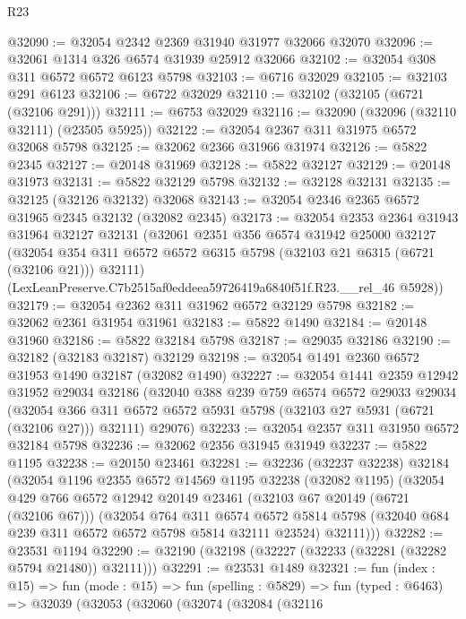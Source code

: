 \begin{lexlean}{R23}
\begin{coremodule}
@32090 := @32054 @2342 @2369 @31940 @31977 @32066 @32070
@32096 := @32061 @1314 @326 @6574 @31939 @25912 @32066
@32102 := @32054 @308 @311 @6572 @6572 @6123 @5798
@32103 := @6716 @32029
@32105 := @32103 @291 @6123
@32106 := @6722 @32029
@32110 := @32102 (@32105 (@6721 (@32106 @291)))
@32111 := @6753 @32029
@32116 := @32090 (@32096 (@32110 @32111) (@23505 @5925))
@32122 := @32054 @2367 @311 @31975 @6572 @32068 @5798
@32125 := @32062 @2366 @31966 @31974
@32126 := @5822 @2345
@32127 := @20148 @31969
@32128 := @5822 @32127
@32129 := @20148 @31973
@32131 := @5822 @32129 @5798
@32132 := @32128 @32131
@32135 := @32125 (@32126 @32132) @32068
@32143 := @32054 @2346 @2365 @6572 @31965 @2345 @32132 (@32082 @2345)
@32173 := @32054
    @2353
    @2364
    @31943
    @31964
    @32127
    @32131
    (@32061
      @2351
      @356
      @6574
      @31942
      @25000
      @32127
      (@32054 @354 @311 @6572 @6572 @6315 @5798 (@32103 @21 @6315 (@6721 (@32106 @21))) @32111)
      (LexLeanPreserve.C7b2515af0eddeea59726419a6840f51f.R23.__rel_46 @5928))
@32179 := @32054 @2362 @311 @31962 @6572 @32129 @5798
@32182 := @32062 @2361 @31954 @31961
@32183 := @5822 @1490
@32184 := @20148 @31960
@32186 := @5822 @32184 @5798
@32187 := @29035 @32186
@32190 := @32182 (@32183 @32187) @32129
@32198 := @32054 @1491 @2360 @6572 @31953 @1490 @32187 (@32082 @1490)
@32227 := @32054
    @1441
    @2359
    @12942
    @31952
    @29034
    @32186
    (@32040
      @388
      @239
      @759
      @6574
      @6572
      @29033
      @29034
      (@32054 @366 @311 @6572 @6572 @5931 @5798 (@32103 @27 @5931 (@6721 (@32106 @27))) @32111)
      @29076)
@32233 := @32054 @2357 @311 @31950 @6572 @32184 @5798
@32236 := @32062 @2356 @31945 @31949
@32237 := @5822 @1195
@32238 := @20150 @23461
@32281 := @32236
    (@32237 @32238)
    @32184
    (@32054
      @1196
      @2355
      @6572
      @14569
      @1195
      @32238
      (@32082 @1195)
      (@32054
        @429
        @766
        @6572
        @12942
        @20149
        @23461
        (@32103 @67 @20149 (@6721 (@32106 @67)))
        (@32054
          @764
          @311
          @6574
          @6572
          @5814
          @5798
          (@32040 @684 @239 @311 @6572 @6572 @5798 @5814 @32111 @23524)
          @32111)))
@32282 := @23531 @1194
@32290 := @32190 (@32198 (@32227 (@32233 (@32281 (@32282 @5794 @21480)) @32111)))
@32291 := @23531 @1489
@32321 := fun (index : @15) =>
  fun (mode : @15) =>
  fun (spelling : @5829) =>
  fun (typed : @6463) =>
  @32039
    (@32053
      (@32060
        (@32074
          (@32084
            (@32116

\end{coremodule}
\end{lexlean}
